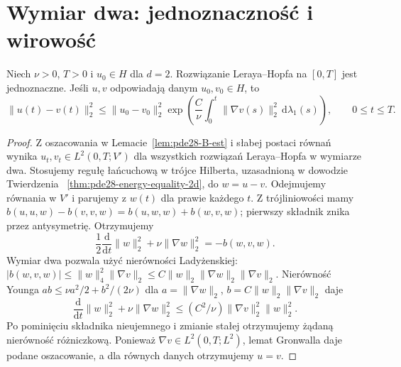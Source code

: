 \section{Wymiar dwa: jednoznaczność i wirowość}
\begin{twierdzenie}
\label{thm:pde28-unique2d}
Niech $\nu>0$, $T>0$ i $u_0\in H$ dla $d=2$.
Rozwiązanie Leraya--Hopfa na $[0,T]$ jest jednoznaczne.
Jeśli $u,v$ odpowiadają danym $u_0,v_0\in H$, to
\[
 \|u(t)-v(t)\|_2^2\le\|u_0-v_0\|_2^2
 \exp\left(\frac C\nu\int_0^t\|\nabla v(s)\|_2^2\,\mathrm d\lambda_1(s)\right),
 \qquad 0\le t\le T.
\]
\end{twierdzenie}
\begin{proof}
Z oszacowania w Lemacie~\ref{lem:pde28-B-est}
i słabej postaci równań wynika
$u_t,v_t\in L^2(0,T;V')$ dla wszystkich rozwiązań
Leraya--Hopfa w wymiarze dwa.
Stosujemy regułę łańcuchową w trójce Hilberta,
uzasadnioną w dowodzie Twierdzenia
~\ref{thm:pde28-energy-equality-2d}, do $w=u-v$.
Odejmujemy równania w $V'$ i parujemy z $w(t)$
dla prawie każdego $t$.
Z trójliniowości mamy
$b(u,u,w)-b(v,v,w)=b(u,w,w)+b(w,v,w)$;
pierwszy składnik znika przez antysymetrię.
Otrzymujemy
\[
 \frac12\frac{\mathrm d}{\mathrm dt}\|w\|_2^2
 +\nu\|\nabla w\|_2^2=-b(w,v,w).
\]
Wymiar dwa pozwala użyć nierówności Ladyżenskiej:
$|b(w,v,w)|\le\|w\|_4^2\|\nabla v\|_2
\le C\|w\|_2\|\nabla w\|_2\|\nabla v\|_2$.
Nierówność Younga $ab\le\nu a^2/2+b^2/(2\nu)$
dla $a=\|\nabla w\|_2$,
$b=C\|w\|_2\|\nabla v\|_2$ daje
\[
 \frac{\mathrm d}{\mathrm dt}\|w\|_2^2
 +\nu\|\nabla w\|_2^2
 \le (C^2/\nu)\|\nabla v\|_2^2\|w\|_2^2.
\]
Po pominięciu składnika nieujemnego i zmianie
stałej otrzymujemy żądaną nierówność różniczkową.
Ponieważ $\nabla v\in L^2(0,T;L^2)$,
lemat Gronwalla daje podane oszacowanie, a dla równych
danych otrzymujemy $u=v$.
\end{proof}

